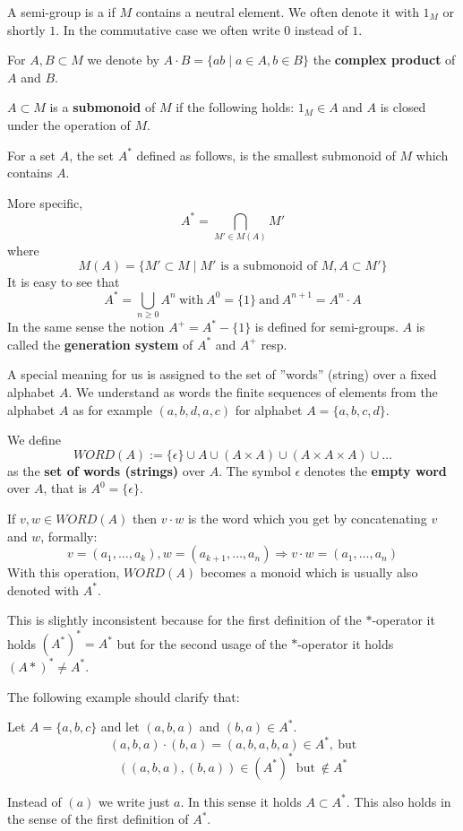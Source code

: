 A semi-group is a  if $M$ contains a neutral element. We
often denote it with $1_M$ or shortly $1$. In the commutative case we often write $0$
instead of $1$.

For $A,B \subset M$ we denote by $A \cdot B = \{ a b \mid a \in A, b \in B \}$
the {\bf complex product} of $A$ and $B$.

$A \subset M$ is a {\bf submonoid} of $M$ if the following holds: $1_M \in A$
and $A$ is closed under the operation of $M$.

For a set $A$, the set $A^*$ defined as follows, is the smallest submonoid of
$M$ which contains $A$. 

More specific,
\[ A^* = \bigcap_{M' \in M(A)} M'	\]
where \[ M(A) = \{ M' \subset M \mid M' \mbox{ is a submonoid of } M, A \subset
M' \} \]
It is easy to see that
\[ A^* = \bigcup_{n \geq 0} A^n\ \mbox{with}\ A^0 = \{1\}\ \mbox{and}\ A^{n+1} =
A^n \cdot A \]
In the same sense the notion $A^+ = A^* - \{1\}$ is defined for semi-groups. $A$
is called the {\bf generation system} of $A^*$ and $A^+$ resp.

A special meaning for us is assigned to the set of ''words'' (string) over a
fixed alphabet $A$. We understand as words the finite sequences of elements from
the alphabet $A$ as for example $(a,b,d,a,c)$ for alphabet $A = \{ a,b,c,d \}$.

We define
\[
WORD(A) := \{\epsilon\} \cup A \cup (A \times A) \cup (A \times A \times A) \cup
\ldots
\]
as the {\bf set of words (strings)} over $A$. The symbol $\epsilon$ denotes the
{\bf empty word} over $A$, that is $A^0 = \{\epsilon\}$.

If $v, w \in WORD(A)$ then $v \cdot w$ is the word which you get by
concatenating $v$ and $w$, formally:
\[ v = (a_1,\ldots, a_k), w = (a_{k+1}, \ldots, a_n) \Rightarrow v \cdot
w = (a_1, \ldots, a_n) \]
With this operation, $WORD(A)$ becomes a monoid which is usually also denoted
with $A^*$. 

This is slightly inconsistent because for the first definition of
the $*$-operator it holds $(A^*)^* = A^*$ but for the second usage of the
$*$-operator it holds $(A*)^* \neq A^*$.

The following example should clarify that: 

Let $A = \{a,b,c\}$ and let $(a,b,a)$ and $(b,a) \in A^*$.
\[(a,b,a)\cdot(b,a) = (a,b,a,b,a) \in A^*,\ \mbox{but}\]
\[((a,b,a),(b,a)) \in (A^*)^*\ \mbox{but}\ \notin A^*\]

Instead of $(a)$ we write just $a$. In this sense it holds $A \subset A^*$. This
also holds in the sense of the first definition of $A^*$.

